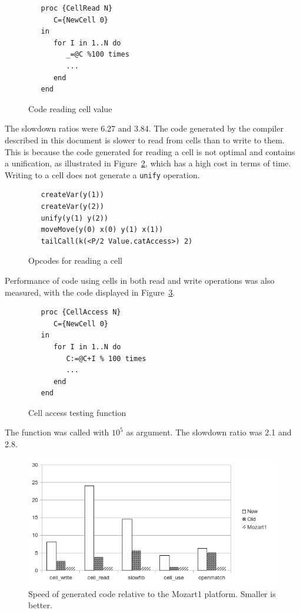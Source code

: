 \documentclass[a4paper]{memoir}
\begin{document}
\begin{figure}[h]
\begin{lstlisting}
   proc {CellRead N}
      C={NewCell 0}
   in
      for I in 1..N do
         _=@C %100 times
         ...
      end
   end
\end{lstlisting}
\caption{Code reading cell value}
\label{fig:perf:cellread}
\end{figure}

The slowdown ratios were 6.27 and 3.84.
The code generated by the compiler described in this document is slower to read from cells than to write to them.
This is because the code generated for reading a cell is not optimal and contains a unification,
as illustrated in Figure~\ref{fig:perf:cellreadunif}, which has a high cost in
terms of time. Writing to a cell does not generate a \lstinline!unify!
operation. 

\begin{figure}[h]
\begin{lstlisting}
   createVar(y(1))
   createVar(y(2))
   unify(y(1) y(2))
   moveMove(y(0) x(0) y(1) x(1))
   tailCall(k(<P/2 Value.catAccess>) 2)
\end{lstlisting}
\caption{Opcodes for reading a cell}
\label{fig:perf:cellreadunif}
\end{figure}



Performance of code using cells in both read and write operations was also measured, with the code displayed in
Figure~\ref{fig:perf:cells}.

\begin{figure}[h]
\begin{lstlisting}
   proc {CellAccess N}
      C={NewCell 0}
   in
      for I in 1..N do
         C:=@C+I % 100 times
         ...
      end
   end
\end{lstlisting}
\caption{Cell access testing function}
\label{fig:perf:cells}
\end{figure}


The function was called with $10^5$ as argument.
The slowdown ratio was 2.1 and 2.8.

\begin{figure}[ht]
\includegraphics[scale=0.8]{../perfs/chart.png}
\caption{Speed of generated code relative to the Mozart1 platform. Smaller is better.}
\label{fig:chart}
\end{figure}
\end{document}
